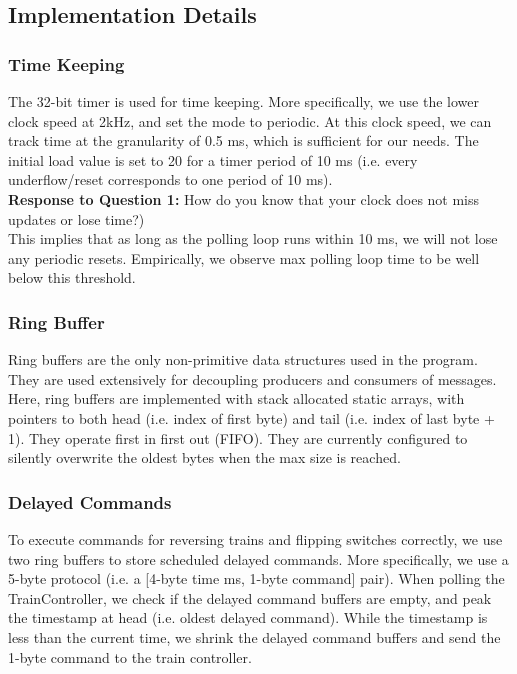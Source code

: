 \documentclass[11pt]{article}
\begin{document}
\subsection{Implementation Details}
\subsubsection{Time Keeping}
The 32-bit timer is used for time keeping. More specifically, we use the lower clock speed at 2kHz, and set the mode to periodic. At this clock speed, we can track time at the granularity of 0.5 ms, which is sufficient for our needs. The initial load value is set to 20 for a timer period of 10 ms (i.e. every underflow/reset corresponds to one period of 10 ms).\\

\noindent
\textbf{Response to Question 1:} How do you know that your clock does not miss updates or lose
time?) \\

\noindent
This implies that as long as the polling loop runs within 10 ms, we will not lose any periodic resets. Empirically, we observe max polling loop time to be well below this threshold.

\subsubsection{Ring Buffer}
Ring buffers are the only non-primitive data structures used in the program. They are used extensively for decoupling producers and consumers of messages. Here, ring buffers are implemented with stack allocated static arrays, with pointers to both head (i.e. index of first byte) and tail (i.e. index of last byte + 1). They operate first in first out (FIFO). They are currently configured to silently overwrite the oldest bytes when the max size is reached.

\subsubsection{Delayed Commands}
To execute commands for reversing trains and flipping switches correctly, we use two ring buffers to store scheduled delayed commands. More specifically, we use a 5-byte protocol (i.e. {a [4-byte time ms, 1-byte command]} pair). When polling the TrainController, we check if the delayed command buffers are empty, and peak the timestamp at head (i.e. oldest delayed command). While the timestamp is less than the current time, we shrink the delayed command buffers and send the 1-byte command to the train controller.
\end{document}
